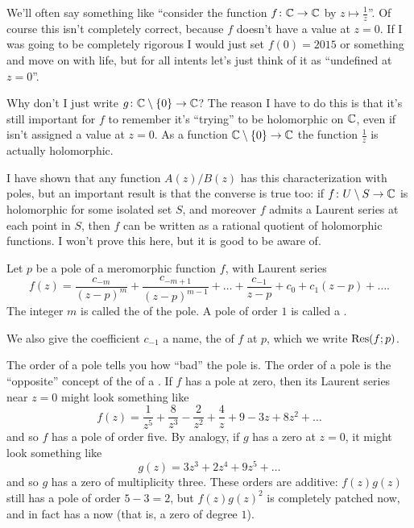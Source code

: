 \begin{abuse}
	We'll often say something like
	``consider the function $f \colon \mathbb C \to \mathbb C$
	by $z \mapsto \frac 1z$''.
	Of course this isn't completely correct,
	because $f$ doesn't have a value at $z=0$.
	If I was going to be completely rigorous
	I would just set $f(0) = 2015$ or something and move on
	with life, but for all intents
	let's just think of it as ``undefined at $z=0$''.

	Why don't I just write $g \colon \mathbb C \setminus \{0\} \to \mathbb C$?
	The reason I have to do this is that it's still important
	for $f$ to remember it's ``trying'' to be holomorphic on $\mathbb C$,
	even if isn't assigned a value at $z=0$.
	As a function $\mathbb C \setminus \{0\} \to \mathbb C$ the function $\frac 1z$ is actually holomorphic.
\end{abuse}

\begin{remark}
	I have shown that any function $A(z)/B(z)$
	has this characterization with poles,
	but an important result is
	that the converse is true too:
	if $f \colon U \setminus S \to \mathbb C$ is holomorphic for some isolated set $S$,
	and moreover $f$ admits a Laurent series at each point in $S$,
	then $f$ can be written as a rational quotient of holomorphic functions.
	I won't prove this here, but it is good to be aware of.
\end{remark}

\begin{definition}
	Let $p$ be a pole of a meromorphic function $f$, with Laurent series
	\[
		f(z) =
		\frac{c_{-m}}{(z-p)^m}
		+ \frac{c_{-m+1}}{(z-p)^{m-1}}
		+ \dots
		+ \frac{c_{-1}}{z-p} + c_0 + c_1 (z-p) + \dots.
	\]
	The integer $m$ is called the  of the pole.
	A pole of order $1$ is called a .

	We also give the coefficient $c_{-1}$ a name, the  of $f$ at $p$,
	which we write $\operatorname{Res}(f;p)$.
\end{definition}

The order of a pole tells you how ``bad'' the pole is.
The order of a pole is the ``opposite'' concept of the  of a .
If $f$ has a pole at zero, then its Laurent series near $z=0$ might look something like
\[ f(z) = \frac{1}{z^5} + \frac{8}{z^3} - \frac{2}{z^2} + \frac{4}{z} + 9 - 3z + 8z^2 + \dots \]
and so $f$ has a pole of order five.
By analogy, if $g$ has a zero at $z=0$, it might look something like
\[ g(z) = 3z^3 + 2z^4 + 9z^5 + \dots \]
and so $g$ has a zero of multiplicity three.
These orders are additive: $f(z) g(z)$ still has a pole of order $5-3=2$,
but $f(z)g(z)^2$ is completely patched now, and in fact has a  now
(that is, a zero of degree $1$).

